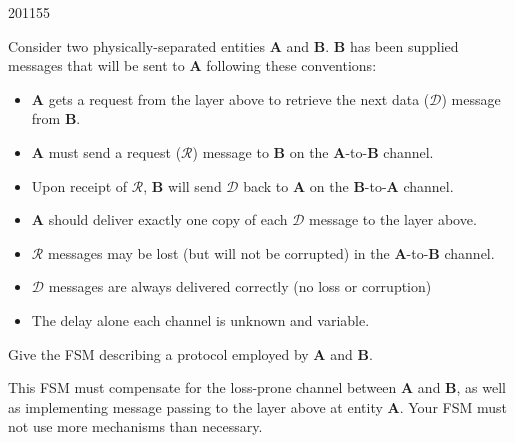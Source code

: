 \documentclass[10pt,\jkfside,a4paper]{article}
\begin{document}
\begin{examquestion}{2011}{5}{5}

Consider two physically-separated entities $\mathbf{A}$ and $\mathbf{B}$.
$\mathbf{B}$ has been supplied messages that will be sent to $\mathbf{A}$
following these conventions:
\begin{itemize}

\item $\mathbf{A}$ gets a request from the layer above to retrieve the next
data ($\mathcal{D}$) message from $\mathbf{B}$.

\item $\mathbf{A}$ must send a request ($\mathcal{R}$) message to
$\mathbf{B}$ on the $\mathbf{A}$-to-$\mathbf{B}$ channel.

\item Upon receipt of $\mathcal{R}$, $\mathbf{B}$ will send $\mathcal{D}$
back to $\mathbf{A}$ on the $\mathbf{B}$-to-$\mathbf{A}$ channel.

\item $\mathbf{A}$ should deliver exactly one copy of each $\mathcal{D}$
message to the layer above.

\item $\mathcal{R}$ messages may be lost (but will not be corrupted) in the
$\mathbf{A}$-to-$\mathbf{B}$ channel.

\item $\mathcal{D}$ messages are always delivered correctly (no loss or
corruption)

\item The delay alone each channel is unknown and variable.

\end{itemize}

Give the FSM describing a protocol employed by $\mathbf{A}$ and $\mathbf{B}$.

This FSM must compensate for the loss-prone channel between $\mathbf{A}$
and $\mathbf{B}$, as well as implementing message passing to the layer
above at entity $\mathbf{A}$. Your FSM must not use more mechanisms than
necessary.


\end{examquestion}
\end{document}
